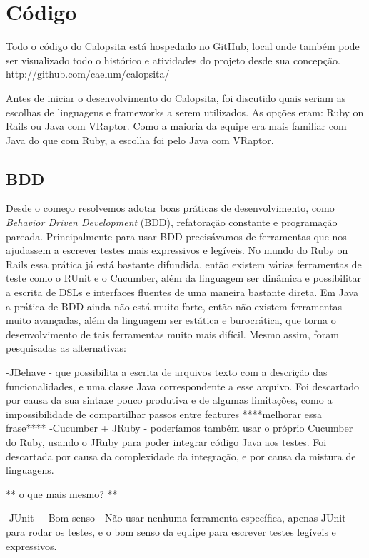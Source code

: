 \section{Código}
Todo o código do Calopsita está hospedado no GitHub, local onde também pode ser visualizado todo o histórico e atividades do projeto desde sua concepção. http://github.com/caelum/calopsita/

Antes de iniciar o desenvolvimento do Calopsita, foi discutido quais seriam as escolhas de linguagens e frameworks a serem utilizados. As opções eram: Ruby on Rails ou Java com VRaptor. Como a maioria da equipe era mais familiar com Java do que com Ruby, a escolha foi pelo Java com VRaptor.

\subsection{BDD}
Desde o começo resolvemos adotar boas práticas de desenvolvimento, como {\it Behavior Driven Development} (BDD), 
refatoração constante e programação pareada. Principalmente para usar BDD precisávamos de ferramentas que nos 
ajudassem a escrever testes mais expressivos e legíveis. No mundo do Ruby on Rails essa prática já está bastante 
difundida, então existem várias ferramentas de teste como o RUnit e o Cucumber, além da linguagem ser dinâmica e 
possibilitar a escrita de DSLs e interfaces fluentes de uma maneira bastante direta. Em Java a prática de BDD ainda 
não está muito forte, então não existem ferramentas muito avançadas, além da linguagem ser estática e burocrática, 
que torna o desenvolvimento de tais ferramentas muito mais difícil. Mesmo assim, foram pesquisadas as alternativas:

-JBehave - que possibilita a escrita de arquivos texto com a descrição das funcionalidades, e uma classe Java 
correspondente a esse arquivo. Foi descartado por causa da sua sintaxe pouco produtiva e de algumas limitações, 
como a impossibilidade de compartilhar passos entre features ****melhorar essa frase****
-Cucumber + JRuby - poderíamos também usar o próprio Cucumber do Ruby, usando o JRuby para poder integrar código 
Java aos testes. Foi descartada por causa da complexidade da integração, e por causa da mistura de linguagens.

** o que mais mesmo? **

-JUnit + Bom senso - Não usar nenhuma ferramenta específica, apenas JUnit para rodar os testes, e o bom senso da 
equipe para escrever testes legíveis e expressivos.

